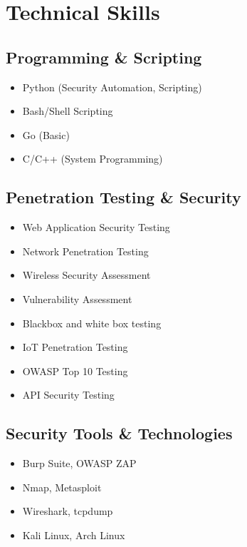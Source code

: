 \documentclass[11pt,a4paper]{article}
\begin{document}
\section{Technical Skills}
\begin{multicols}{2}
\subsection{Programming \& Scripting}
\begin{itemize}[leftmargin=0.15in, label={}]
\small{\item{
\begin{itemize}
\item Python (Security Automation, Scripting)
\item Bash/Shell Scripting
\item Go (Basic)
\item C/C++ (System Programming)
\end{itemize}
}}
\end{itemize}

\subsection{Penetration Testing \& Security}
\begin{itemize}[leftmargin=0.15in, label={}]
\small{\item{
\begin{itemize}
\item Web Application Security Testing
\item Network Penetration Testing
\item Wireless Security Assessment
\item Vulnerability Assessment
\item Blackbox and white box testing
\item IoT Penetration Testing
\item OWASP Top 10 Testing
\item API Security Testing
\end{itemize}
}}
\end{itemize}

\subsection{Security Tools \& Technologies}
\begin{itemize}[leftmargin=0.15in, label={}]
\small{\item{
\begin{itemize}
\item Burp Suite, OWASP ZAP
\item Nmap, Metasploit
\item Wireshark, tcpdump
\item Kali Linux, Arch Linux
\end{itemize}
}}
\end{itemize}


\end{multicols}
\end{document}

